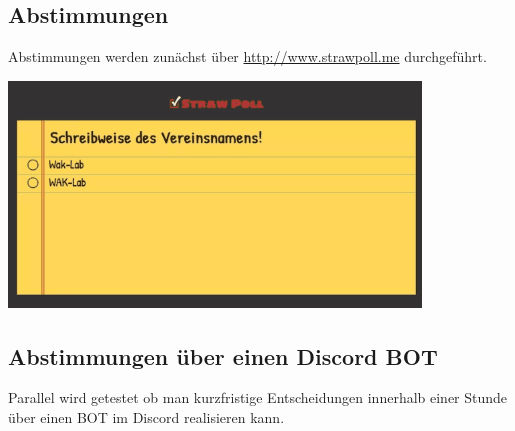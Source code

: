 \subsection{Abstimmungen}
Abstimmungen werden zunächst über \url{http://www.strawpoll.me} durchgeführt.\\

\begin{minipage}[t]{\textwidth}
  \centering
  \includegraphics[height=6cm]{pictures/StrawPoll.png}
  \label{img:StrawPoll}
\end{minipage}
\subsection{Abstimmungen über einen Discord BOT}
Parallel wird getestet ob man kurzfristige Entscheidungen innerhalb einer Stunde über einen BOT im Discord realisieren kann.

